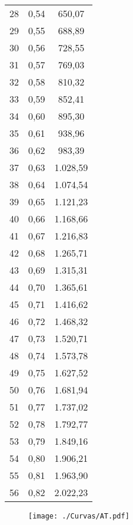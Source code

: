 \documentclass[]{article}
\begin{document}
\begin{longtable}[t]{ccc}
28 & 0,54 & 650,07\\
29 & 0,55 & 688,89\\
30 & 0,56 & 728,55\\
31 & 0,57 & 769,03\\
32 & 0,58 & 810,32\\
33 & 0,59 & 852,41\\
34 & 0,60 & 895,30\\
35 & 0,61 & 938,96\\
36 & 0,62 & 983,39\\
37 & 0,63 & 1.028,59\\
38 & 0,64 & 1.074,54\\
39 & 0,65 & 1.121,23\\
40 & 0,66 & 1.168,66\\
41 & 0,67 & 1.216,83\\
42 & 0,68 & 1.265,71\\
43 & 0,69 & 1.315,31\\
44 & 0,70 & 1.365,61\\
45 & 0,71 & 1.416,62\\
46 & 0,72 & 1.468,32\\
47 & 0,73 & 1.520,71\\
48 & 0,74 & 1.573,78\\
49 & 0,75 & 1.627,52\\
50 & 0,76 & 1.681,94\\
51 & 0,77 & 1.737,02\\
52 & 0,78 & 1.792,77\\
53 & 0,79 & 1.849,16\\
54 & 0,80 & 1.906,21\\
55 & 0,81 & 1.963,90\\
56 & 0,82 & 2.022,23\\*
\end{longtable}

\clearpage

\begin{sidewaysfigure}[htb]
   \centering
   \texttt{[image: ./Curvas/AT.pdf]}
\end{sidewaysfigure}

\clearpage
\end{document}
